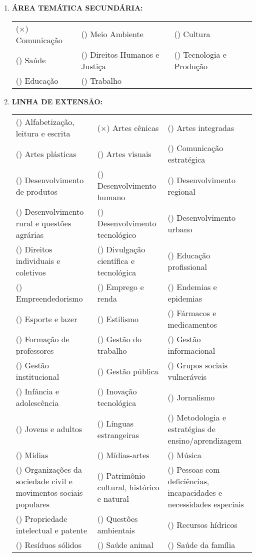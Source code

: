 \documentclass[12pt,a4paper,oneside]{article}%
\begin{document}
\begin{enumerate}
\item%
\textbf{ÁREA TEMÁTICA SECUNDÁRIA: }%
\newline%
\begin{tabularx}{\linewidth}{|X|X|X|}%
\hline%
($\times$) Comunicação&() Meio Ambiente&() Cultura\\%
() Saúde&() Direitos Humanos e Justiça&() Tecnologia e Produção\\%
() Educação&() Trabalho&\\%
\hline%
\end{tabularx}%
\item%
\textbf{LINHA DE EXTENSÃO: }%
\newline%
{\tiny%
\begin{tabularx}{\linewidth}{X|X|X}%
() Alfabetização, leitura e escrita&($\times$) Artes cênicas&() Artes integradas\\%
() Artes plásticas&() Artes visuais&() Comunicação estratégica\\%
() Desenvolvimento de produtos&() Desenvolvimento humano&() Desenvolvimento regional\\%
() Desenvolvimento rural e questões agrárias&() Desenvolvimento tecnológico&() Desenvolvimento urbano\\%
() Direitos individuais e coletivos&() Divulgação científica e tecnológica&() Educação profissional\\%
() Empreendedorismo&() Emprego e renda&() Endemias e epidemias\\%
() Esporte e lazer&() Estilismo&() Fármacos e medicamentos\\%
() Formação de professores&() Gestão do trabalho&() Gestão informacional\\%
() Gestão institucional&() Gestão pública&() Grupos sociais vulneráveis\\%
() Infância e adolescência&() Inovação tecnológica&() Jornalismo\\%
() Jovens e adultos&() Línguas estrangeiras&() Metodologia e estratégias de ensino/aprendizagem\\%
() Mídias&() Mídias{-}artes&() Música\\%
() Organizações da sociedade civil e movimentos sociais populares&() Patrimônio cultural, histórico e natural&() Pessoas com deficiências, incapacidades e necessidades especiais\\%
() Propriedade intelectual e patente&() Questões ambientais&() Recursos hídricos\\%
() Resíduos sólidos&() Saúde animal&() Saúde da família\\%

\end{tabularx}}
\end{enumerate}
\end{document}
